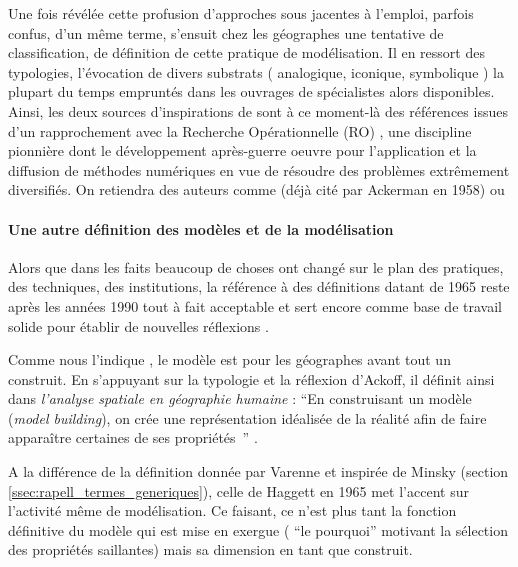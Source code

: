 Une fois révélée cette profusion d'approches sous jacentes à l'emploi, parfois confus, d'un même terme, s'ensuit chez les géographes une tentative de classification, de définition de cette pratique de modélisation. Il en ressort des typologies, l'évocation de divers substrats ( analogique, iconique, symbolique ) la plupart du temps empruntés dans les ouvrages de spécialistes alors disponibles. Ainsi, les deux sources d'inspirations de \textcites[106]{Berry1963}{Haggett1965} sont à ce moment-là des références issues d'un rapprochement avec la Recherche Opérationnelle (RO) , une discipline pionnière dont le développement après-guerre oeuvre pour l'application et la diffusion de méthodes numériques en vue de résoudre des problèmes extrêmement diversifiés. On retiendra des auteurs comme \textcite{Ackoff1962} (déjà cité par Ackerman en 1958) ou \textcite{Kemeny1962}

\paragraph{Une autre définition des modèles et de la modélisation}
\label{p:autre_def_modele}

Alors que dans les faits beaucoup de choses ont changé sur le plan des pratiques, des techniques, des institutions, la référence à des définitions datant de 1965 reste après les années 1990 tout à fait acceptable \autocites{Dastes2001b, Antony2013}[295]{Bailly1995} et sert encore comme base de travail solide pour établir de nouvelles réflexions \autocite{Brunet2000}. 

Comme nous l'indique \textcite{Haggett1965}, le modèle est pour les géographes avant tout un construit. En s'appuyant sur la typologie et la réflexion d'Ackoff, il définit ainsi dans \textit{l'analyse spatiale en géographie humaine} : \enquote{En construisant un modèle (\textit{model building}), on crée une représentation idéalisée de la réalité afin de faire apparaître certaines de ses propriétés } \autocite[30]{Haggett1965}. 


A la différence de la définition donnée par Varenne  et inspirée de Minsky (section \ref{ssec:rapell_termes_generiques}), celle de Haggett en 1965 met l'accent sur l'activité même de modélisation. Ce faisant, ce n'est plus tant la fonction définitive du modèle qui est mise en exergue ( \enquote{le pourquoi} motivant la sélection des propriétés saillantes) mais sa dimension en tant que construit.

